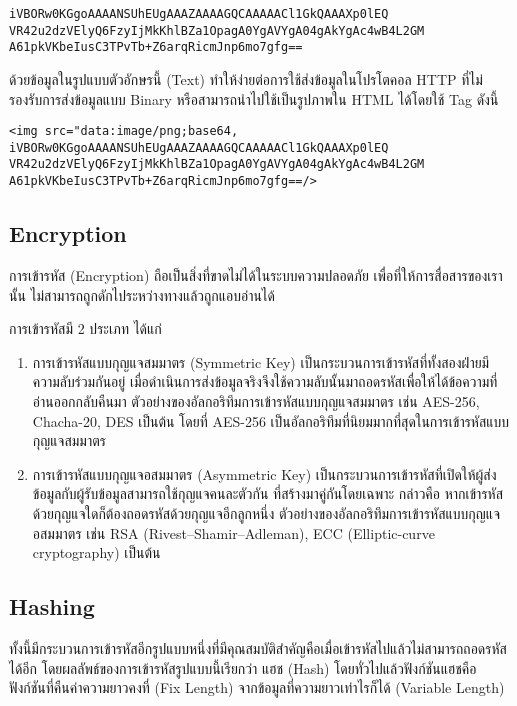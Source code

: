 \begin{lstlisting}[numbers=none]
iVBORw0KGgoAAAANSUhEUgAAAZAAAAGQCAAAAACl1GkQAAAXp0lEQ
VR42u2dzVElyQ6FzyIjMkKhlBZa1OpagA0YgAVYgA04gAkYgAc4wB4L2GM
A61pkVKbeIusC3TPvTb+Z6arqRicmJnp6mo7gfg==
\end{lstlisting}

ด้วยข้อมูลในรูปแบบตัวอักษรนี้ (Text) ทำให้ง่ายต่อการใช้ส่งข้อมูลในโปรโตคอล HTTP ที่ไม่รองรับการส่งข้อมูลแบบ Binary หรือสามารถนำไปใช้เป็นรูปภาพใน HTML ได้โดยใช้ Tag ดังนี้

\begin{lstlisting}[numbers=none]
<img src="data:image/png;base64, iVBORw0KGgoAAAANSUhEUgAAAZAAAAGQCAAAAACl1GkQAAAXp0lEQ VR42u2dzVElyQ6FzyIjMkKhlBZa1OpagA0YgAVYgA04gAkYgAc4wB4L2GM A61pkVKbeIusC3TPvTb+Z6arqRicmJnp6mo7gfg==/>
\end{lstlisting}

\subsection{Encryption}

การเข้ารหัส (Encryption) ถือเป็นสิ่งที่ขาดไม่ได้ในระบบความปลอดภัย เพื่อที่ให้การสื่อสารของเรานั้น ไม่สามารถถูกดักไประหว่างทางแล้วถูกแอบอ่านได้

การเข้ารหัสมี 2 ประเภท ได้แก่

\begin{enumerate}
	\item การเข้ารหัสแบบกุญแจสมมาตร (Symmetric Key) เป็นกระบวนการเข้ารหัสที่ทั้งสองฝ่ายมีความลับร่วมกันอยู่ เมื่อดำเนินการส่งข้อมูลจริงจึงใช้ความลับนั้นมาถอดรหัสเพื่อให้ได้ข้อความที่อ่านออกกลับคืนมา ตัวอย่างของอัลกอริทึมการเข้ารหัสแบบกุญแจสมมาตร เช่น AES-256, Chacha-20, DES เป็นต้น โดยที่ AES-256 เป็นอัลกอริทึมที่นิยมมากที่สุดในการเข้ารหัสแบบกุญแจสมมาตร
	\item การเข้ารหัสแบบกุญแจอสมมาตร (Asymmetric Key) เป็นกระบวนการเข้ารหัสที่เปิดให้ผู้ส่งข้อมูลกับผู้รับข้อมูลสามารถใช้กุญแจคนละตัวกัน ที่สร้างมาคู่กันโดยเฉพาะ กล่าวคือ หากเข้ารหัสด้วยกุญแจใดก็ต้องถอดรหัสด้วยกุญแจอีกลูกหนึ่ง ตัวอย่างของอัลกอริทึมการเข้ารหัสแบบกุญแจอสมมาตร เช่น RSA (Rivest–Shamir–Adleman), ECC (Elliptic-curve cryptography) เป็นต้น
\end{enumerate}

\subsection{Hashing}

ทั้งนี้มีกระบวนการเข้ารหัสอีกรูปแบบหนึ่งที่มีคุณสมบัติสำคัญคือเมื่อเข้ารหัสไปแล้วไม่สามารถถอดรหัสได้อีก โดยผลลัพธ์ของการเข้ารหัสรูปแบบนี้เรียกว่า แฮช (Hash) โดยทั่วไปแล้วฟังก์ชันแฮชคือฟังก์ชันที่คืนค่าความยาวคงที่ (Fix Length) จากข้อมูลที่ความยาวเท่าไรก็ได้ (Variable Length)

